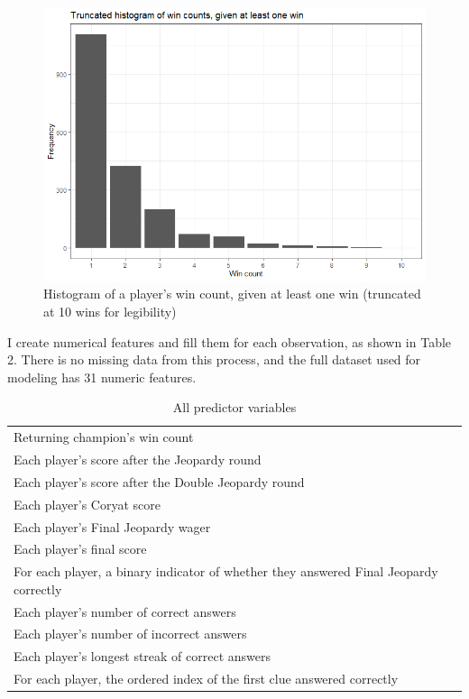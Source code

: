 \documentclass{article}
\begin{document}
	\begin{figure}[H]
		\centering
		\includegraphics[width=\textwidth]{win_count_hist.png}
		\caption{Histogram of a player's win count, given at least one win (truncated at 10 wins for legibility)}
	\end{figure}
	
	I create numerical features and fill them for each observation, as shown in Table 2. There is no missing data from this process, and the full dataset used for modeling has 31 numeric features.
	
		\begin{table}[H]
		\centering
		\caption{All predictor variables\\}
			\begin{tabular}{l}
				\hline
				Returning champion's win count \\
				Each player's score after the Jeopardy round \\
				Each player's score after the Double Jeopardy round \\
				Each player's Coryat score \\
				Each player's Final Jeopardy wager \\
				Each player's final score \\
				For each player, a binary indicator of whether they answered Final Jeopardy correctly \\
				Each player's number of correct answers \\
				Each player's number of incorrect answers \\
				Each player's longest streak of correct answers \\
				For each player, the ordered index of the first clue answered correctly
			\end{tabular}
	\end{table}
	
\end{document}
